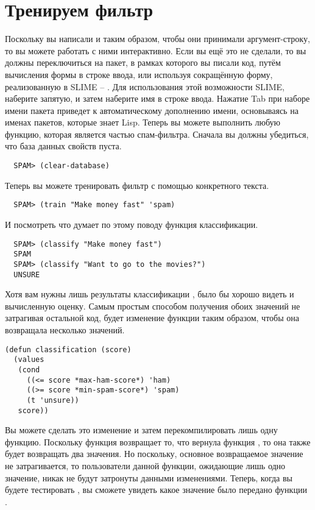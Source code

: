 \section{Тренируем фильтр}

Поскольку вы написали  и  таким образом, чтобы они принимали
аргумент-строку, то вы можете работать с ними интерактивно.  Если вы ещё это не сделали,
то вы должны переключиться на пакет, в рамках которого вы писали код, путём вычисления
формы  в строке ввода, или используя сокращённую форму, реализованную в
SLIME -- .  Для использования этой возможности SLIME, наберите
запятую, и затем наберите имя в строке ввода.  Нажатие Tab при наборе имени пакета
приведет к автоматическому дополнению имени, основываясь на именах пакетов, которые знает
Lisp.  Теперь вы можете выполнить любую функцию, которая является частью спам-фильтра.
Сначала вы должны убедиться, что база данных свойств пуста.

\begin{verbatim}
  SPAM> (clear-database)
\end{verbatim}

Теперь вы можете тренировать фильтр с помощью конкретного текста.

\begin{verbatim}
  SPAM> (train "Make money fast" 'spam)
\end{verbatim}

И посмотреть что думает по этому поводу функция классификации.

\begin{verbatim}
  SPAM> (classify "Make money fast")
  SPAM
  SPAM> (classify "Want to go to the movies?")
  UNSURE
\end{verbatim}

Хотя вам нужны лишь результаты классификации , было бы хорошо видеть и вычисленную оценку.
Самым простым способом получения обоих значений не затрагивая остальной код, будет
изменение функции  таким образом, чтобы она возвращала несколько
значений.

\begin{lstlisting}
(defun classification (score)
  (values
   (cond
     ((<= score *max-ham-score*) 'ham)
     ((>= score *min-spam-score*) 'spam)
     (t 'unsure))
   score))
\end{lstlisting}

Вы можете сделать это изменение и затем перекомпилировать лишь одну функцию.  Поскольку
функция  возвращает то, что вернула функция , то она
также будет возвращать два значения.  Но поскольку, основное возвращаемое значение не
затрагивается, то пользователи данной функции, ожидающие лишь одно значение, никак не
будут затронуты данными изменениями.  Теперь, когда вы будете тестировать ,
вы сможете увидеть какое значение было передано функции .

